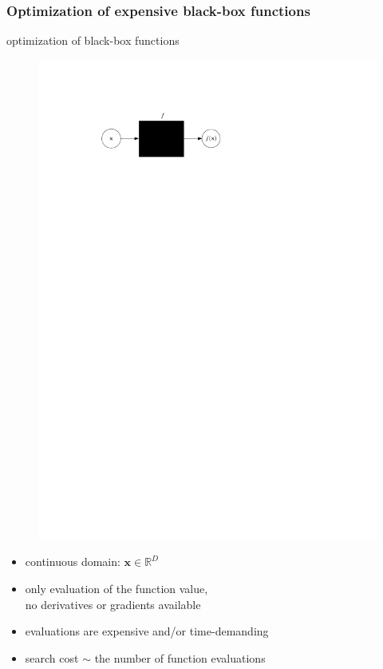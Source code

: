 \documentclass[sans,mathserif]{beamer}
\newcommand{\xx}{\mathrm{\mathbf{x}}}
\begin{document}
\begin{frame}
  \frametitle{Optimization of expensive black-box functions}
  optimization of black-box functions
  \begin{figure}
  \includegraphics[width=0.6\linewidth]{img/black-box-function}
  \end{figure}
  \begin{itemize}
    \item continuous domain: $\xx \in \mathbb{R}^D$
    \item only evaluation of the function value, \\
      \alert{no derivatives} or gradients available
    \item evaluations are \alert{expensive} and/or time-demanding
    \item search cost $\sim$ the number of function evaluations
  \end{itemize}
\end{frame}
\end{document}
